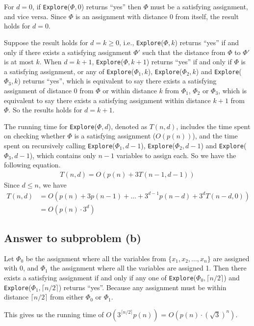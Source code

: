 \documentclass[12pt,letterpaper]{article}
\begin{document}
For $d = 0$, if {\tt Explore}($\Phi, 0$) returns ``yes'' then $\Phi$ must be a satisfying assignment, and vice versa. Since $\Phi$ is an assignment with distance 0 from itself, the result holds for $d=0$.

Suppose the result holds for $d = k\ge 0$, i.e., {\tt Explore}($\Phi, k$) returns ``yes'' if and only if there exists
a satisfying assignment $\Phi'$ such that the distance from $\Phi$ to $\Phi'$ is at
most $k$. When $d=k+1$, {\tt Explore}($\Phi, k+1$) returns ``yes'' if and only if $\Phi$ is a satisfying assignment, or any of {\tt Explore}($\Phi_1, k$), {\tt Explore}($\Phi_2, k$) and {\tt Explore}($\Phi_3, k$) returns ``yes'', which is equivalent to say there exists a satisfying assignment of distance 0 from $\Phi$ or within distance $k$ from $\Phi_1$, $\Phi_2$ or $\Phi_3$, which is equivalent to say there exists a satisfying assignment within distance $k+1$ from $\Phi$. So the results holds for $d=k+1$.

The running time for {\tt Explore}($\Phi, d$), denoted as $T(n, d)$, includes the time spent on checking whether $\Phi$ is a satisfying assignment ($O(p(n))$), and the time spent on recursively calling {\tt Explore}($\Phi_1, d-1$), {\tt Explore}($\Phi_2, d-1$) and {\tt Explore}($\Phi_3, d-1$), which contains only $n-1$ variables to assign each. So we have the following equation.
\begin{align}
T(n,d) = O(p(n)+3T(n-1, d-1))
\end{align}
Since $d\le n$, we have
\begin{align}
\nonumber T(n,d) & = O(p(n)+3p(n-1)+\dots+3^{d-1}p(n-d)+3^dT(n-d, 0))\\
& =O(p(n)\cdot3^d)
\end{align}

\subsection*{Answer to subproblem (b)}
Let $\Phi_0$ be the assignment where all the variables from $\{x_1, x_2, \dots, x_n\}$ are assigned with 0, and $\Phi_1$ the assignment where all the variables are assigned 1. Then there exists a satisfying assignment if and only if any one of {\tt Explore}($\Phi_0,\lceil n/2 \rceil$) and {\tt Explore}($\Phi_1,\lceil n/2 \rceil$) returns ``yes''. Because any assignment must be within distance $\lceil n/2 \rceil$ from either $\Phi_0$ or $\Phi_1$.

This gives us the running time of $O(3^{\lceil n/2\rceil}p(n))$ = $O(p(n)\cdot(\sqrt{3})^n)$.
\end{document}

